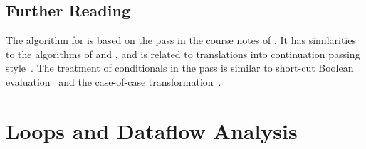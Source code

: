 \documentclass[7x10]{TimesAPriori_MIT}%
\numberwithin{theorem}{chapter}
\numberwithin{definition}{chapter}
\numberwithin{equation}{chapter}
\begin{document}
\section{Further Reading}
\label{sec:cond-further-reading}

The algorithm for  is based on the
 pass in the course notes of
\citet{Dybvig:2010aa}.
%
It has similarities to the algorithms of \citet{Danvy:2003fk} and
\citet{Appel:2003fk}, and is related to translations into continuation
passing
style~\citep{Wijngaarden:1966,Fischer:1972,reynolds72:_def_interp,Plotkin:1975,Friedman:2001}.
%
The treatment of conditionals in the  pass is
similar to short-cut Boolean
evaluation~\citep{Logothetis:1981,Aho:2006wb,Clarke:1989,Danvy:2003fk}
and the case-of-case transformation~\citep{PeytonJones:1998}.

\chapter{Loops and Dataflow Analysis}
\label{ch:Lwhile}
\setcounter{footnote}{0}


\end{document}
